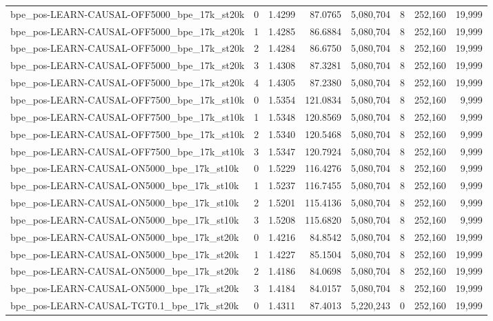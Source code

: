 \begin{tabular}{lrrrrrrr}
bpe\_pos-LEARN-CAUSAL-OFF5000\_bpe\_17k\_st20k & 0 & 1.4299 & 87.0765 & 5,080,704 & 8 & 252,160 & 19,999 \\
bpe\_pos-LEARN-CAUSAL-OFF5000\_bpe\_17k\_st20k & 1 & 1.4285 & 86.6884 & 5,080,704 & 8 & 252,160 & 19,999 \\
bpe\_pos-LEARN-CAUSAL-OFF5000\_bpe\_17k\_st20k & 2 & 1.4284 & 86.6750 & 5,080,704 & 8 & 252,160 & 19,999 \\
bpe\_pos-LEARN-CAUSAL-OFF5000\_bpe\_17k\_st20k & 3 & 1.4308 & 87.3281 & 5,080,704 & 8 & 252,160 & 19,999 \\
bpe\_pos-LEARN-CAUSAL-OFF5000\_bpe\_17k\_st20k & 4 & 1.4305 & 87.2380 & 5,080,704 & 8 & 252,160 & 19,999 \\
bpe\_pos-LEARN-CAUSAL-OFF7500\_bpe\_17k\_st10k & 0 & 1.5354 & 121.0834 & 5,080,704 & 8 & 252,160 & 9,999 \\
bpe\_pos-LEARN-CAUSAL-OFF7500\_bpe\_17k\_st10k & 1 & 1.5348 & 120.8569 & 5,080,704 & 8 & 252,160 & 9,999 \\
bpe\_pos-LEARN-CAUSAL-OFF7500\_bpe\_17k\_st10k & 2 & 1.5340 & 120.5468 & 5,080,704 & 8 & 252,160 & 9,999 \\
bpe\_pos-LEARN-CAUSAL-OFF7500\_bpe\_17k\_st10k & 3 & 1.5347 & 120.7924 & 5,080,704 & 8 & 252,160 & 9,999 \\
bpe\_pos-LEARN-CAUSAL-ON5000\_bpe\_17k\_st10k & 0 & 1.5229 & 116.4276 & 5,080,704 & 8 & 252,160 & 9,999 \\
bpe\_pos-LEARN-CAUSAL-ON5000\_bpe\_17k\_st10k & 1 & 1.5237 & 116.7455 & 5,080,704 & 8 & 252,160 & 9,999 \\
bpe\_pos-LEARN-CAUSAL-ON5000\_bpe\_17k\_st10k & 2 & 1.5201 & 115.4136 & 5,080,704 & 8 & 252,160 & 9,999 \\
bpe\_pos-LEARN-CAUSAL-ON5000\_bpe\_17k\_st10k & 3 & 1.5208 & 115.6820 & 5,080,704 & 8 & 252,160 & 9,999 \\
bpe\_pos-LEARN-CAUSAL-ON5000\_bpe\_17k\_st20k & 0 & 1.4216 & 84.8542 & 5,080,704 & 8 & 252,160 & 19,999 \\
bpe\_pos-LEARN-CAUSAL-ON5000\_bpe\_17k\_st20k & 1 & 1.4227 & 85.1504 & 5,080,704 & 8 & 252,160 & 19,999 \\
bpe\_pos-LEARN-CAUSAL-ON5000\_bpe\_17k\_st20k & 2 & 1.4186 & 84.0698 & 5,080,704 & 8 & 252,160 & 19,999 \\
bpe\_pos-LEARN-CAUSAL-ON5000\_bpe\_17k\_st20k & 3 & 1.4184 & 84.0157 & 5,080,704 & 8 & 252,160 & 19,999 \\
bpe\_pos-LEARN-CAUSAL-TGT0.1\_bpe\_17k\_st20k & 0 & 1.4311 & 87.4013 & 5,220,243 & 0 & 252,160 & 19,999 \\

\end{tabular}

